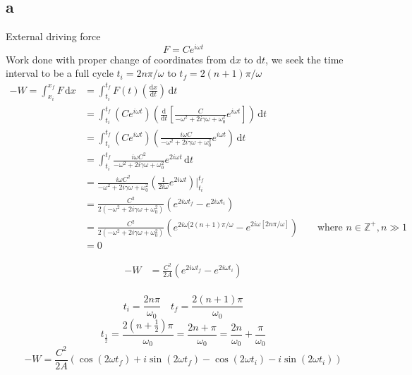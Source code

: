 \documentclass[12pt,letter]{article}
\begin{document}
{\subsection*{a} 
External driving force 
\[ F = C e^{i \omega t}
\]
Work done with proper change of coordinates from $\mathrm{d} x$ to $\mathrm{d} t$, we seek the time interval to be a full cycle $ t_i = 2 n \pi / \omega$ to $t_f = 2 (n+1) \pi / \omega$
\begin{align*} 
- W = 
	\int_{x_i}^{x_f}  F \, \mathrm{d} x &=
\int_{t_i}^{t_f}  F(t) \left(\frac{\mathrm{d} x}{\mathrm{d} t}\right) \, \mathrm{d} t \\
&= 
\int_{t_i}^{t_f} (C e^{i \omega t}) \left(\frac{\mathrm{d} }{\mathrm{d} t} 
\left[\frac{C}{- \omega^2 + 2 i \gamma \omega + \omega_0^2} e^{i \omega t}
\right]\right)  \, \mathrm{d} t \\ &=  
\int_{t_i}^{t_f} (C e^{i \omega t}) \left(
\frac{ i \omega C}{- \omega^2 + 2 i \gamma \omega + \omega_0^2} e^{i \omega t}
\right)  \, \mathrm{d} t \\ 
&= 
\int_{t_i}^{t_f} 
\frac{ i \omega C^2 }{- \omega^2 + 2 i \gamma \omega + \omega_0^2} 
e^{2 i \omega t }
\, \mathrm{d} t \\ &=
\frac{ i \omega C^2 }{- \omega^2 + 2 i \gamma \omega + \omega_0^2} 
\left(
\frac{1}{2 i \omega } e^{2 i \omega t}   
\right)\Biggr\rvert_{t_i}^{t_f}  
\\		   &= 
\frac{ C^2 }{ 2 (- \omega^2 + 2 i \gamma \omega + \omega_0^2)} 
\left(
e^{2 i \omega t_f }- e^{ 2 i \omega t_i}   
\right) 
\\		   &= 
\frac{ C^2 }{ 2 (- \omega^2 + 2 i \gamma \omega + \omega_0^2)} 
\left(
	e^{2 i \omega [2(n+1) \pi / \omega }- e^{ 2 i \omega [2 n \pi / \omega ]}   
\right)
		   && \text{ where $n \in \mathbb{Z}^{+}, n \gg 1$}  \\
		   &= 0 
\end{align*} 


\begin{align*}
	-W &= \frac{C^2}{2 A} \left(e^{2 i \omega t_f} - e^{2 i \omega t_i}\right)  \\
\end{align*}

\[
t_i = \frac{2n \pi }{\omega_0} \quad t_f = \frac{2 (n+1) \pi }{\omega_0}
\]
\[
	t_{\frac{1}{2} } = \frac{2 \left(n+ \frac{1}{2}\right) \pi }{\omega_0} = \frac{2n + \pi }{\omega_0} = \frac{2 n }{\omega_0}  + \frac{\pi}{\omega_0}
\]
\[
-W = \frac{C^2}{2A} \left(\cos(2 \omega t_f) + i \sin (2 \omega t_f) - \cos(2 \omega t_i) - i \sin (2 \omega t_i)\right)
\]

}
\end{document}

